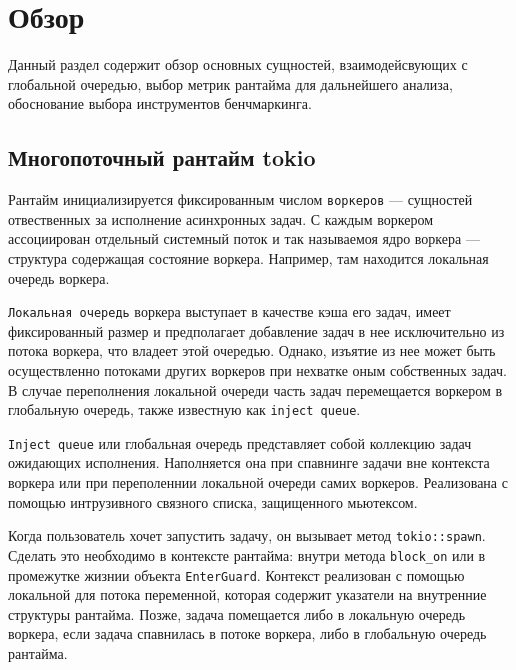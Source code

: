 
\section{Обзор}

Данный раздел содержит обзор основных сущностей, взаимодейсвующих с глобальной очередью, выбор метрик рантайма для дальнейшего анализа, обоснование выбора инструментов бенчмаркинга.

\subsection{Многопоточный рантайм tokio}

Рантайм инициализируется фиксированным числом \verb|воркеров| --- сущностей отвественных за исполнение асинхронных задач. С каждым воркером ассоциирован отдельный системный поток и так называемоя ядро воркера --- структура содержащая состояние воркера. Например, там находится локальная очередь воркера.

\verb|Локальная очередь| воркера выступает в качестве кэша его задач, имеет фиксированный размер и предполагает добавление задач в нее исключительно из потока воркера, что владеет этой очередью. Однако, изъятие из нее может быть осуществленно потоками других воркеров при нехватке оным собственных задач. В случае переполнения локальной очереди часть задач перемещается воркером в глобальную очередь, также известную как \verb|inject queue|.

\verb|Inject queue| или глобальная очередь представляет собой коллекцию задач ожидающих исполнения. Наполняется она при спавнинге задачи вне контекста воркера или при переполеннии локальной очереди самих воркеров. Реализована с помощью интрузивного связного списка, защищенного мьютексом.

Когда пользователь хочет запустить задачу, он вызывает метод \verb|tokio::spawn|. Сделать это необходимо в контексте рантайма: внутри метода \verb|block_on| или в промежутке жизнии объекта \verb|EnterGuard|. Контекст реализован с помощью локальной для потока переменной, которая содержит указатели на внутренние структуры рантайма. Позже, задача помещается либо в локальную очередь воркера, если задача спавнилась в потоке воркера, либо в глобальную очередь рантайма.



